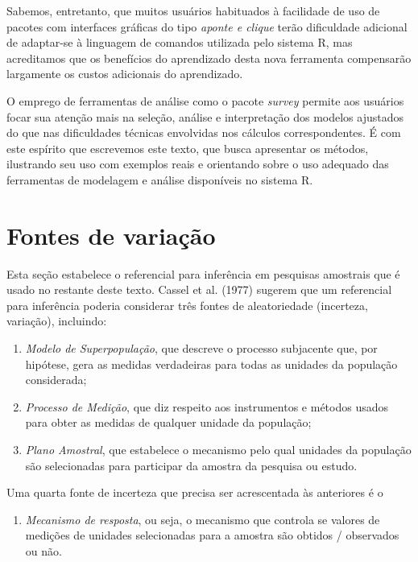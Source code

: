 \documentclass[
  12pt,
  brazilian,
]{book}
\providecommand{\tightlist}{%
  \setlength{\itemsep}{0pt}\setlength{\parskip}{0pt}}
\theoremstyle{definition}
\theoremstyle{definition}
\theoremstyle{definition}
\theoremstyle{definition}
\theoremstyle{remark}
\begin{document}
Sabemos, entretanto, que muitos usuários habituados à facilidade de uso de pacotes com interfaces gráficas do tipo \emph{aponte e clique} terão dificuldade adicional de adaptar-se à linguagem de comandos utilizada pelo sistema R, mas acreditamos que os benefícios do aprendizado desta nova ferramenta compensarão largamente os custos adicionais do aprendizado.

O emprego de ferramentas de análise como o pacote \emph{survey} permite aos
usuários focar sua atenção mais na seleção, análise e interpretação dos modelos
ajustados do que nas dificuldades técnicas envolvidas nos cálculos
correspondentes. É com este espírito que escrevemos este texto, que busca
apresentar os métodos, ilustrando seu uso com exemplos reais e orientando sobre o uso adequado das ferramentas de modelagem e análise disponíveis no sistema R.

\hypertarget{fontes-de-variauxe7uxe3o}{%
\section{Fontes de variação}\label{fontes-de-variauxe7uxe3o}}

Esta seção estabelece o referencial para inferência em pesquisas amostrais que
é usado no restante deste texto. Cassel et al. (1977) sugerem que um referencial para
inferência poderia considerar três fontes de aleatoriedade (incerteza,
variação), incluindo:

\begin{enumerate}
\def\labelenumi{\arabic{enumi}.}
\item
  \emph{Modelo de Superpopulação}, que descreve o processo subjacente que, por
  hipótese, gera as medidas verdadeiras para todas as unidades da população
  considerada;
\item
  \emph{Processo de Medição}, que diz respeito aos instrumentos e métodos usados
  para obter as medidas de qualquer unidade da população;
\item
  \emph{Plano Amostral}, que estabelece o mecanismo pelo qual unidades da
  população são selecionadas para participar da amostra da pesquisa ou estudo.
\end{enumerate}

Uma quarta fonte de incerteza que precisa ser acrescentada às anteriores é o

\begin{enumerate}
\def\labelenumi{\arabic{enumi}.}
\setcounter{enumi}{3}
\tightlist
\item
  \emph{Mecanismo de resposta}, ou seja, o mecanismo que controla se valores de
  medições de unidades selecionadas para a amostra são obtidos / observados ou
  não.
\end{enumerate}
\end{document}
